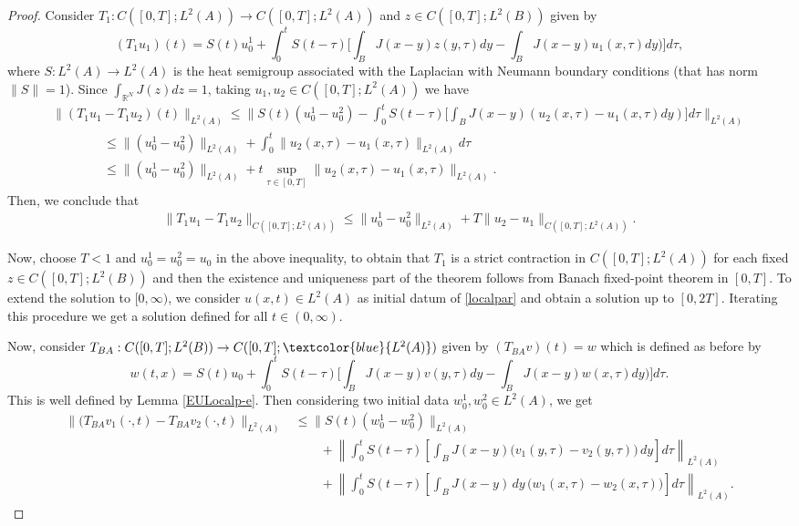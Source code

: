 \documentclass[reqno]{amsart}
\numberwithin{equation}{section}
\begin{document}
\begin{proof} 
Consider $T_{1}:C([0,T]; L^2(A))\to C([0,T]; L^2(A))$ and $z\in C([0,T]; L^2(B))$ given by
$$(T_1u_1)(t)=S(t){u_0^1}+\int_{0}^{t}S(t-\tau)\bigg[\int_BJ(x-y)z(y,\tau)dy-\int_BJ(x-y)u_1(x,\tau)dy)\bigg] d\tau,$$
where $S:L^2(A)\to L^2(A)$ is the heat semigroup associated with the Laplacian with Neumann boundary conditions 
(that has norm $\|S\|=1$). Since $\int_{\mathbb{R}^N}J(z)dz=1$, taking $u_1,u_2 \in C([0,T];L^2(A))$ we have
\begin{equation}
\begin{array}{l}
\displaystyle \|(T_1u_1 -T_1 u_2) (t)\|_{L^2(A)}
\displaystyle \leq \bigg\|S(t){(u^1_{0}-u_0^2)}-\int_{0}^{t}S(t-\tau)\bigg[\int_BJ(x-y)(u_2(x,\tau)-u_1(x,\tau)dy)\bigg] d\tau\bigg \|_{L^2(A)}\\[10pt]
\displaystyle 
\qquad \qquad \leq {\|(u^1_{0}-u_0^2)\|_{L^2(A)}}+\int_{0}^{t}\|u_2(x,\tau)-u_1(x,\tau)\|_{L^2(A)}d\tau \\[10pt]
\displaystyle 
\qquad \qquad 
\leq {\|(u^1_{0}-u_0^2)\|_{L^2(A)}}+t\sup_{\tau \in [0,T]}\|u_2(x,\tau)-u_1(x,\tau)\|_{L^2(A)}.
\end{array}
\end{equation}
Then, we conclude that
\begin{align}
\|T_1u_1-T_1u_2\|_{C([0,T];L^2(A))}\leq \|u^1_{0}-u_0^2\|_{L^2(A)}+T\|u_2-u_1\|_{C([0,T];L^2(A))}.
\end{align}

Now, choose $T<1$ and $u_0^1=u_0^2=u_0$ in the above inequality, to obtain that $T_1$ is a strict contraction in $C([0,T];L^2(A))$ for each fixed $z\in C([0,T];L^2(B))$ and then the existence and uniqueness part of the theorem follows from Banach fixed-point theorem in $[0,T]$. To extend the solution to $[0,\infty)$, we consider $u(x,t)\in L^2(A)$ as initial datum of \eqref{localpar}
and obtain a solution up to $[0,2T]$. Iterating this procedure we get a solution defined for all $t\in (0,\infty)$.

Now, consider $T_{BA}:C([0,T]; L^2(B))\to C([0,T]; \textcolor{blue}{L^2(A)})$ given by
$(T_{BA}v)(t)=w$ which is defined as before by
$$w(t,x)=S(t)u_0+\int_{0}^{t}S(t-\tau)\bigg[\int_BJ(x-y)v(y,\tau)dy-\int_BJ(x-y)w(x,\tau)dy)\bigg] d\tau.$$
This is well defined by Lemma \eqref{EULocalp-e}.
Then considering two initial data $w_0^1,w_0^2\in L^2(A)$, we get
$$
\begin{array}{rl}
\displaystyle \|(T_{BA}v_1(\cdot,t)-T_{BA}v_2(\cdot,t)\|_{L^2(A)}
& \displaystyle \le 
\|S(t)(w_0^1 - w_0^2)\|_{L^2(A)}  \\[10pt]
& \displaystyle \qquad + 
\left\|
\int_0^t 
S(t-\tau)\!\left[
   \int_B J(x-y)\big( v_1(y,\tau) - v_2(y,\tau) \big)\,dy
\right] d\tau
\right\|_{L^2(A)} \\[10pt]
& \displaystyle  \qquad +
\left\|
\int_0^t 
S(t-\tau)\!\left[
   \int_B J(x-y)\,dy \, \big( w_1(x,\tau) - w_2(x,\tau) \big)
\right] d\tau
\right\|_{L^2(A)} .
\end{array}
$$


\end{proof}
\end{document}
